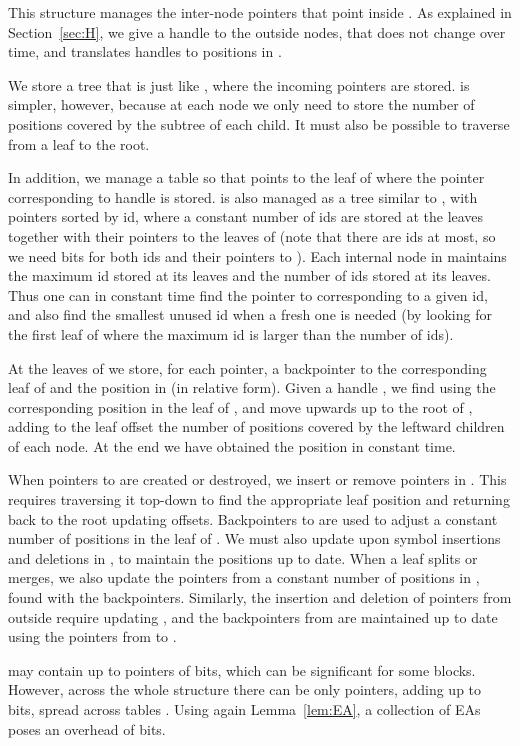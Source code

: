 \documentclass[11pt]{article}
\begin{document}
This structure manages the inter-node pointers that point inside .
As explained in Section~\ref{sec:H}, we give a handle to the outside nodes, 
that does
not change over time, and  translates handles to positions in .

We store a tree  that is just like , where the incoming pointers 
are stored.  is simpler, however, because at each node we only need to
store the number of positions covered by the subtree of each child. It must
also be possible to traverse  from a leaf to the root. 

In addition, we manage a table  so that  points to the leaf of 
 where the pointer corresponding to handle  is stored.  is also
managed as a tree similar to , with pointers sorted by id,
where a constant number of ids  are stored
at the leaves together with their pointers to the leaves of  (note that 
there are  ids at most, so we need  
bits for both ids and their pointers to ). Each internal node in  
maintains the maximum id stored at its leaves and the number of ids stored at 
its leaves. Thus one can in constant time find the pointer to  
corresponding to a given id, and also find the smallest unused id when a
fresh one is needed (by looking for the first leaf of  where the maximum
id is larger than the number of ids).

At the leaves of  we store, for each pointer, a backpointer 
to the corresponding leaf of  and the position in  (in relative 
form). Given a handle , we find using  the corresponding position in the
leaf of , and move upwards up to the root of , adding to the leaf 
offset the 
number of positions covered by the leftward children of each node. At the end 
we have obtained the position in constant time.

When pointers to  are created or destroyed, we insert or remove
pointers in . This requires traversing it top-down to find the appropriate
leaf position and returning back to the root updating offsets. Backpointers to
 are used to adjust a constant number of positions in the leaf of .
We must also update  upon symbol insertions and deletions in
, to maintain the positions up to date. When a leaf splits or merges,
we also update the pointers from a constant number of positions in
, found with the backpointers. Similarly, the insertion and deletion of
pointers from outside require updating , and the backpointers from 
are maintained up to date using the pointers from  to .

 may contain up to  pointers of  
bits, which can be significant for some blocks. However, across the whole
structure there can be only  pointers,
adding up to  bits, spread across
 tables . Using again Lemma~\ref{lem:EA},
a collection of EAs poses an overhead of  bits.
\end{document}
